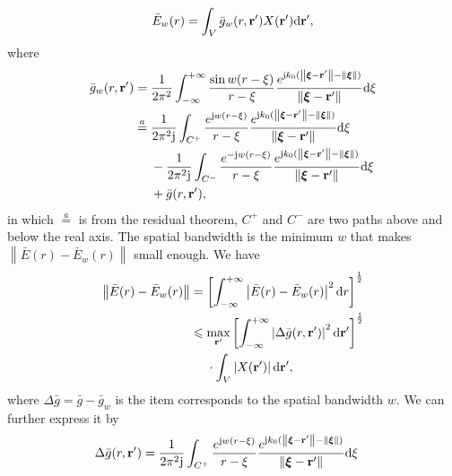 \documentclass[a4paper,12pt]{article}
\begin{document}
\begin{framed}
{    \begin{equation}
        \bar{E}_w({r}) = \int_V \bar{g}_w({r},{\bf r}') X({\bf r}') {\rm d}{\bf r}',
    \end{equation}
    where 
    \begin{equation}
        \begin{aligned}
        \bar{g}_w({r},{\bf r}') &= \frac{1}{2\pi^2} \int_{-\infty}^{+\infty} \frac{\sin w(r-\xi)}{r-\xi}\frac{e^{{\rm j}k_0(\left\| \boldsymbol{\xi}-{\bf r}' \right\|-\left\| \boldsymbol{\xi} \right\|)}}{\left\| \boldsymbol{\xi}-{\bf r}' \right\|}{\rm d}\xi
        \\& \overset{a}{=} \frac{1}{2\pi^2{\rm j}} \int_{C^+} \frac{e^{ {\rm j}w(r-\xi)}}{r-\xi}\frac{e^{{\rm j}k_0(\left\| \boldsymbol{\xi}-{\bf r}' \right\|-\left\| \boldsymbol{\xi} \right\|)}}{\left\| \boldsymbol{\xi}-{\bf r}' \right\|}{\rm d}\xi 
        \\& ~~~~- \frac{1}{2\pi^2{\rm j}} \int_{C^-} \frac{e^{ -{\rm j}w(r-\xi)}}{r-\xi}\frac{e^{{\rm j}k_0(\left\| \boldsymbol{\xi}-{\bf r}' \right\|-\left\| \boldsymbol{\xi} \right\|)}}{\left\| \boldsymbol{\xi}-{\bf r}' \right\|}{\rm d}\xi 
        \\&~~~~+ \bar{g}({r},{\bf r}'),
        \end{aligned}
    \end{equation}
    in which $\overset{a}{=}$ is from the residual theorem, $C^+$ and $C^-$ are two paths above and below the real axis.
    The spatial bandwidth is the minimum $w$ that makes $\left\|\bar{E}(r)-\bar{E}_w(r)\right\|$ small enough. 
    We have 
    \begin{equation}
        \begin{aligned}
        \left\|\bar{E}(r)-\bar{E}_w(r)\right\| &=  \left[\int_{-\infty}^{+\infty}  \left|\bar{E}(r)-\bar{E}_w(r)\right|^2{\rm d}r \right]^{\frac{1}{2}}
        \\& \leqslant \underset{{\bf r}'}{\rm max} \left[ \int_{-\infty}^{+\infty} \left| \Delta \bar{g}({r},{\bf r}') \right|^2{\rm d}{\bf r}'  \right]^{\frac{1}{2}} 
        \\& ~~~~\cdot \int_V \left| X({\bf r}') \right| {\rm d}{\bf r}',
        \end{aligned}
    \end{equation}
    where $\Delta \bar{g} = \bar{g}-\bar{g}_w$ is the item corresponds to the spatial bandwidth $w$. We can further express it by
    \begin{equation}
        \begin{aligned}
            \Delta \bar{g}({r},{\bf r}')& =  \frac{1}{2\pi^2{\rm j}} \int_{C^+} \frac{e^{ {\rm j}w(r-\xi)}}{r-\xi}\frac{e^{{\rm j}k_0(\left\| \boldsymbol{\xi}-{\bf r}' \right\|-\left\| \boldsymbol{\xi} \right\|)}}{\left\| \boldsymbol{\xi}-{\bf r}' \right\|}{\rm d}\xi 

\end{aligned}
\end{equation}}
\end{framed}
\end{document}
